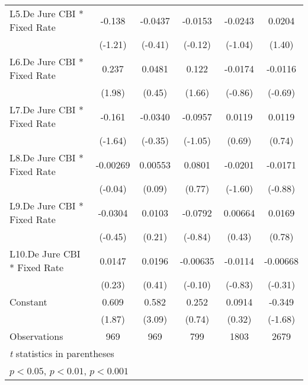 \begin{table}[htbp]
\begin{tabular}{l*{5}{c}}
\addlinespace
L5.De Jure CBI * Fixed Rate             &   -0.138         &  -0.0437         &  -0.0153         &  -0.0243         &   0.0204         \\
                                        &  (-1.21)         &  (-0.41)         &  (-0.12)         &  (-1.04)         &   (1.40)         \\
\addlinespace
L6.De Jure CBI * Fixed Rate             &    0.237\sym{*}  &   0.0481         &    0.122         &  -0.0174         &  -0.0116         \\
                                        &   (1.98)         &   (0.45)         &   (1.66)         &  (-0.86)         &  (-0.69)         \\
\addlinespace
L7.De Jure CBI * Fixed Rate             &   -0.161         &  -0.0340         &  -0.0957         &   0.0119         &   0.0119         \\
                                        &  (-1.64)         &  (-0.35)         &  (-1.05)         &   (0.69)         &   (0.74)         \\
\addlinespace
L8.De Jure CBI * Fixed Rate             & -0.00269         &  0.00553         &   0.0801         &  -0.0201         &  -0.0171         \\
                                        &  (-0.04)         &   (0.09)         &   (0.77)         &  (-1.60)         &  (-0.88)         \\
\addlinespace
L9.De Jure CBI * Fixed Rate             &  -0.0304         &   0.0103         &  -0.0792         &  0.00664         &   0.0169         \\
                                        &  (-0.45)         &   (0.21)         &  (-0.84)         &   (0.43)         &   (0.78)         \\
\addlinespace
L10.De Jure CBI * Fixed Rate            &   0.0147         &   0.0196         & -0.00635         &  -0.0114         & -0.00668         \\
                                        &   (0.23)         &   (0.41)         &  (-0.10)         &  (-0.83)         &  (-0.31)         \\
\addlinespace
Constant                                &    0.609         &    0.582\sym{**} &    0.252         &   0.0914         &   -0.349         \\
                                        &   (1.87)         &   (3.09)         &   (0.74)         &   (0.32)         &  (-1.68)         \\
\midrule
Observations                            &      969         &      969         &      799         &     1803         &     2679         \\
\bottomrule
\multicolumn{6}{l}{\footnotesize \textit{t} statistics in parentheses}\\
\multicolumn{6}{l}{\footnotesize \sym{*} \(p<0.05\), \sym{**} \(p<0.01\), \sym{***} \(p<0.001\)}\\
\end{tabular}
\end{table}
